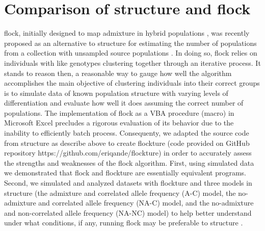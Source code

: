 \section*{Comparison of {\sc structure} and {\sc flock}}
{\sc flock}, initially designed to map admixture in hybrid populations 
\citep{Duc&Tur2009}, was recently proposed as an alternative to 
{\sc structure} for estimating the number of populations from a collection with 
unsampled source populations \citep{Duc&Tur2012}. In doing so, 
{\sc flock} relies on individuals with like genotypes clustering together 
through an iterative process. It stands to reason then, a reasonable way 
to gauge how well the algorithm accomplishes the main objective 
of clustering individuals into their correct groups is to simulate data of known 
population structure with varying levels of differentiation and 
evaluate how well it does assuming the correct number of populations. 
The implementation of {\sc flock} as a VBA procedure (macro) in 
Microsoft Excel precludes a rigorous evaluation of its behavior due 
to the inability to efficiently batch process. Consequenty, we adapted 
the source code from {\sc structure} as describe above to create {\sc flockture}
(code provided on GitHub repository https://github.com/eriqande/flockture) 
in order to accurately assess the strengths and weaknesses of the {\sc flock} 
algorithm. First, using simulated data we demonstrated that {\sc flock} 
and {\sc flockture} are essentially equivalent programs.
Second, we simulated and analyzed datasets with {\sc flockture} 
and three models in {\sc structure} (the admixture and correlated 
allele frequency (A-C) model, the no-admixture and correlated 
allele frequency (NA-C) model, and the no-admixture and non-correlated 
allele frequency (NA-NC) model) to help better understand
under what conditions, if any, running {\sc flock} may be preferable to {\sc structure} . 

